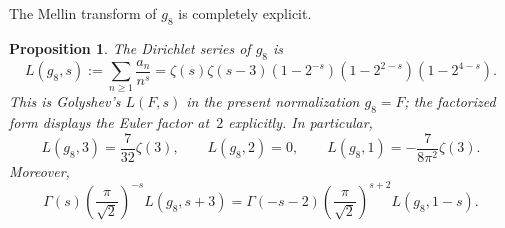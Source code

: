 \documentclass[11pt]{amsart}
\numberwithin{equation}{section}
\theoremstyle{plain}
\newtheorem{proposition}[theorem]{Proposition}
\theoremstyle{definition}
\theoremstyle{remark}
\begin{document}
The Mellin transform of $g_8$ is completely explicit.

\begin{proposition}\label{prop:L-function}
The Dirichlet series of $g_8$ is
\begin{equation}\label{eq:L-factor}
L(g_8,s):=\sum_{n\ge 1}\frac{a_n}{n^s}
=\zeta(s)\zeta(s-3)(1-2^{-s})(1-2^{2-s})(1-2^{4-s}).
\end{equation}
This is Golyshev's $L(F,s)$ \cite[Section~3]{Gol09} in the present
normalization $g_8 = F$; the factorized form displays the Euler factor
at~$2$ explicitly.
In particular,
\begin{equation}\label{eq:L-values}
L(g_8,3)=\frac{7}{32}\zeta(3),
\qquad
L(g_8,2)=0,
\qquad
L(g_8,1)=-\frac{7}{8\pi^2}\zeta(3).
\end{equation}
Moreover,
\begin{equation}\label{eq:L-functional}
\Gamma(s)\left(\frac{\pi}{\sqrt2}\right)^{-s}L(g_8,s+3)
=\Gamma(-s-2)\left(\frac{\pi}{\sqrt2}\right)^{s+2}L(g_8,1-s).
\end{equation}
\end{proposition}
\end{document}
